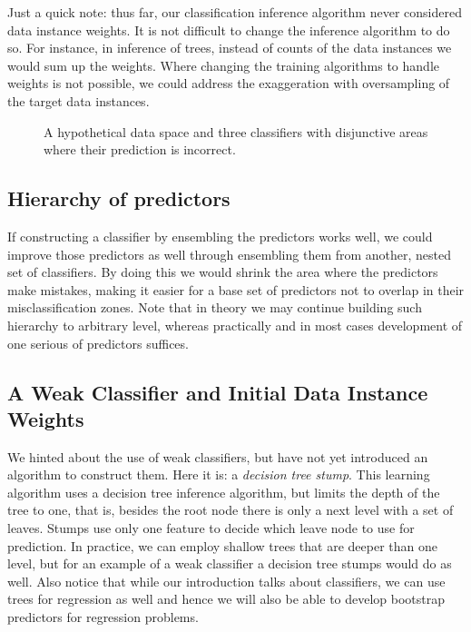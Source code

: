 \begin{refsection}
Just a quick note: thus far, our classification inference algorithm never considered data instance weights. It is not difficult to change the inference algorithm to do so. For instance, in inference of trees, instead of counts of the data instances we would sum up the weights. Where changing the training algorithms to handle weights is not possible, we could address the exaggeration with oversampling of the target data instances.

\begin{figure}
\caption{A hypothetical data space and three classifiers with disjunctive areas where their prediction is incorrect.}
\label{fig:boosting-three-classifiers}
\end{figure}

\subsection*{Hierarchy of predictors}

If constructing a classifier by ensembling the predictors works well, we could improve those predictors as well through ensembling them from another, nested set of classifiers. By doing this we would shrink the area where the predictors make mistakes, making it easier for a base set of predictors not to overlap in their misclassification zones. Note that in theory we may continue building such hierarchy to arbitrary level, whereas practically and in most cases development of one serious of predictors suffices.

\subsection*{A Weak Classifier and Initial Data Instance Weights}

We hinted about the use of weak classifiers, but have not yet introduced an algorithm to construct them. Here it is: a {\em decision tree stump}. This learning algorithm uses a decision tree inference algorithm, but limits the depth of the tree to one, that is, besides the root node there is only a next level with a set of leaves. Stumps use only one feature to decide which leave node to use for prediction. In practice, we can employ shallow trees that are deeper than one level, but for an example of a weak classifier a decision tree stumps would do as well. Also notice that while our introduction talks about classifiers, we can use trees for regression as well and hence we will also be able to develop bootstrap predictors for regression problems.


\end{refsection}
